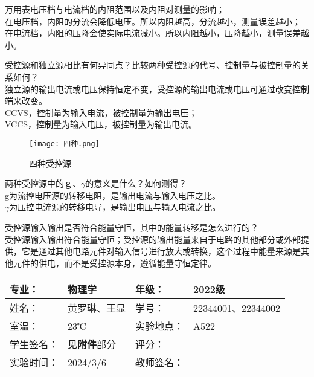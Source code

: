 \documentclass[dvipsnames, svgnames,a4paper,11pt]{article}
\begin{document}
	\begin{question}
		万用表电压档与电流档的内阻范围以及内阻对测量的影响；\\
		在电压档，内阻的分流会降低电压。所以内阻越高，分流越小，测量误差越小；\\
		在电流档，内阻的压降会使实际电流减小。所以内阻越小，压降越小，测量误差越小。
	\end{question}
	\begin{question}
		受控源和独立源相比有何异同点？比较两种受控源的代号、控制量与被控制量的关系如何？\\
		独立源的输出电流或电压保持恒定不变，受控源的输出电流或电压可通过改变控制端来改变。\\
		CCVS，控制量为输入电流，被控制量为输出电压；\\
		 VCCS，控制量为输入电压，被控制量为输出电流。
		 \end{question}
		 \begin{figure}[htbp]
		 	\centering
		 	\texttt{[image: 四种.png]}
		 	\caption{四种受控源}
		 \end{figure}
	
	\begin{question}
		两种受控源中的ｇ、$\gamma$的意义是什么？如何测得？\\
		g为流控电压源的转移电阻，是输出电流与输入电压之比。\\
		$\gamma$为压控电流源的转移电导，是输出电压与输入电流之比。
	\end{question}
	\begin{question}
		受控源输入输出是否符合能量守恒，其中的能量转移是怎么进行的？\\
		受控源输入输出符合能量守恒；受控源的输出能量来自于电路的其他部分或外部提供，它是通过其他电路元件对输入信号进行放大或转换，这个过程中能量来源是其他元件的供电，而不是受控源本身，遵循能量守恒定律。
	\end{question}
	\clearpage
	
	\begin{table}
		\renewcommand\arraystretch{1.7}
		\centering
		\begin{tabularx}{\textwidth}{|X|X|X|X|}
			\hline
			专业： & 物理学 & 年级： & 2022级 \\
			\hline
			姓名： & 黄罗琳、王显 & 学号： & 22344001、22344002\\
			\hline
			室温： &  23℃& 实验地点： & A522 \\
			\hline
			学生签名：& 见\textbf{附件}部分 & 评分： &\\
			\hline
			实验时间：& 2024/3/6 & 教师签名：&\\
			\hline
		\end{tabularx}
	\end{table}
	
\end{document}

